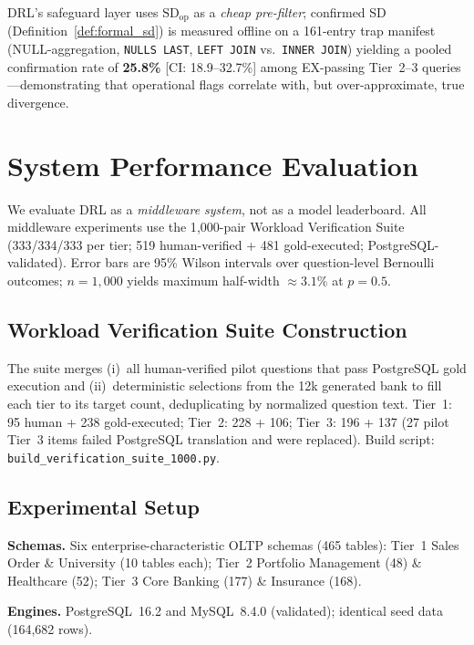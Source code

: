 \documentclass[twocolumn]{svjour3}
\begin{document}
DRL's safeguard layer uses $\text{SD}_{\text{op}}$ as a \emph{cheap pre-filter}; confirmed SD (Definition~\ref{def:formal_sd}) is measured offline on a 161-entry trap manifest (NULL-aggregation, \texttt{NULLS LAST}, \texttt{LEFT JOIN} vs.\ \texttt{INNER JOIN}) yielding a pooled confirmation rate of \textbf{25.8\%} [CI: 18.9--32.7\%] among EX-passing Tier~2--3 queries---demonstrating that operational flags correlate with, but over-approximate, true divergence.

\section{System Performance Evaluation}
\label{sec:eval}

We evaluate DRL as a \emph{middleware system}, not as a model leaderboard.
All middleware experiments use the 1{,}000-pair Workload Verification Suite (333/334/333 per tier; 519 human-verified + 481 gold-executed; PostgreSQL-validated).
Error bars are 95\% Wilson intervals over question-level Bernoulli outcomes; $n{=}1{,}000$ yields maximum half-width $\approx 3.1\%$ at $p{=}0.5$.

\subsection{Workload Verification Suite Construction}

The suite merges (i)~all human-verified pilot questions that pass PostgreSQL gold execution and (ii)~deterministic selections from the 12k generated bank to fill each tier to its target count, deduplicating by normalized question text.
Tier~1: 95 human + 238 gold-executed; Tier~2: 228 + 106; Tier~3: 196 + 137 (27 pilot Tier~3 items failed PostgreSQL translation and were replaced).
Build script: \texttt{build\_verification\_suite\_1000.py}.

\subsection{Experimental Setup}

\textbf{Schemas.} Six enterprise-characteristic OLTP schemas (465 tables): Tier~1 Sales Order \& University (10 tables each); Tier~2 Portfolio Management (48) \& Healthcare (52); Tier~3 Core Banking (177) \& Insurance (168).

\textbf{Engines.} PostgreSQL~16.2 and MySQL~8.4.0 (validated); identical seed data (164{,}682 rows).
\end{document}

